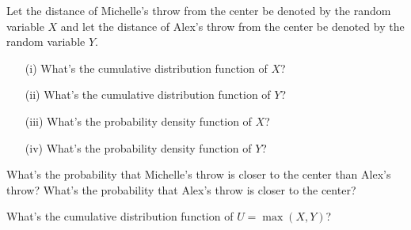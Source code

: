 \documentclass[11pt]{article}
\begin{document}
\begin{Parts}
    \Part Let the distance of Michelle's throw from the center be denoted by the random variable $X$ and let the distance of Alex's throw from the center be denoted by the random variable $Y$.
    \begin{enumerate}
    \item[(i)] What's the cumulative distribution function of $X$?
    \item[(ii)] What's the cumulative distribution function of $Y$?
    \item[(iii)] What's the probability density function of $X$?
    \item[(iv)] What's the probability density function of $Y$?
    \end{enumerate}
    
    \Part What's the probability that Michelle's throw is closer to the center than Alex's throw? What's the probability that Alex's throw is closer to the center? 
    
    \Part What's the cumulative distribution function of $U = \max(X,Y)$?

    
        
\end{Parts}
\end{document}
